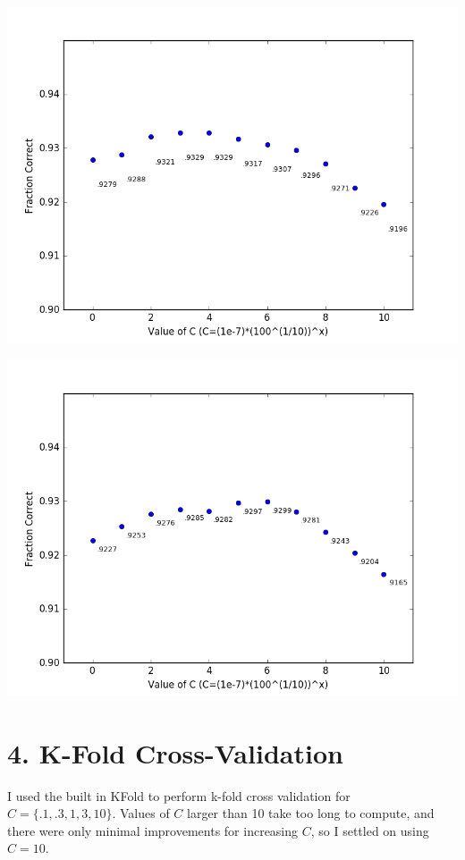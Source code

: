 \documentclass[11pt]{article}
\begin{document}
\includegraphics[scale=.55]{mnist_c_2.png}

\includegraphics[scale=.55]{mnist_c_3.png}

\newpage

\section*{4. K-Fold Cross-Validation}
I used the built in KFold to perform k-fold cross validation for $C=\{.1, .3, 1, 3, 10\}$. Values of $C$ larger than 10 take too long to compute, and there were only minimal improvements for increasing $C$, so I settled on using $C=10$.
\end{document}
